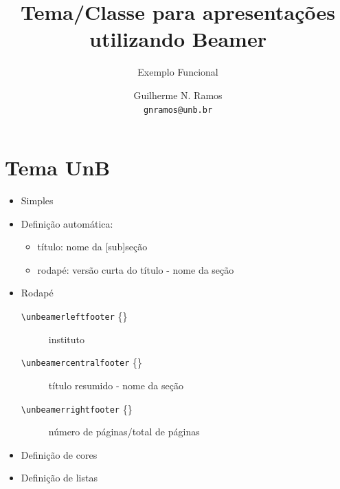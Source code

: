 \documentclass{UnBeamer}%
\title[Beamer + UnB]{Tema/Classe para apresentações utilizando Beamer}%
\subtitle{Exemplo Funcional}%
\author[gnramos]{Guilherme N. Ramos\\%
                 \texttt{gnramos@unb.br}}%
\institute[CIC]{Departamento de Ciência da Computação\\%
                Universidade de Brasília}%
\date[2012]{}%
\makeatletter
\newcommand{\comm}[2][]{%
    \texttt{{\textbackslash}#2}%
    \if#1\@empty%
    \else\{#1\}\fi%
}%
\makeatother
\begin{document}
%
  \frame{\titlepage}%

  \section{Tema UnB}%
  \begin{frame}%
    \begin{itemize}%
      \item Simples%
      \item Definição automática:%
        \begin{itemize}%
          \item título: nome da [sub]seção%
          \item rodapé: versão curta do título - nome da seção%
        \end{itemize}%
      \item Rodapé%
        \begin{description}%
          \item[\comm{unbeamerleftfooter}] instituto%
          \item[\comm{unbeamercentralfooter}] título resumido - nome da seção%
          \item[\comm{unbeamerrightfooter}] número de páginas/total de páginas%
        \end{description}%
      \item Definição de cores %
      \item Definição de listas%
    \end{itemize}%
  \end{frame}%
\end{document}
